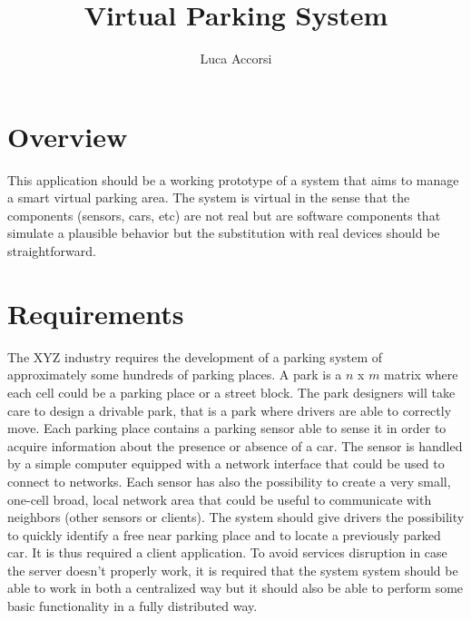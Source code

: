\documentclass[11pt]{article}
\title{\textbf{Virtual Parking System}}
\author{Luca Accorsi}
\date{}
\begin{document}
\maketitle

\section{Overview}
This application should be a working prototype of a system that aims to manage a smart virtual parking area. The system is virtual in the sense that the components (sensors, cars, etc) are not real but are software components that simulate a plausible behavior but the substitution with real devices should be straightforward.

\section{Requirements}
The XYZ industry requires the development of a parking system of approximately some hundreds of parking places. A park is a $n$ x $m$ matrix where each cell could be a parking place or a street block. The park designers will take care to design a drivable park, that is a park where drivers are able to correctly move. Each parking place contains a parking sensor able to sense it in order to acquire information about the presence or absence of a car. The sensor is handled by a simple computer equipped with a network interface that could be used to connect to networks. Each sensor has also the possibility to create a very small, one-cell broad, local network area that could be useful to communicate with neighbors (other sensors or clients). The system should give drivers the possibility to quickly identify a free near parking place and to locate a previously parked car. It is thus required a client application. To avoid services disruption in case the server doesn't properly work, it is required that the system system should be able to work in both a centralized way but it should also be able to perform some basic functionality in a fully distributed way.
\end{document}
